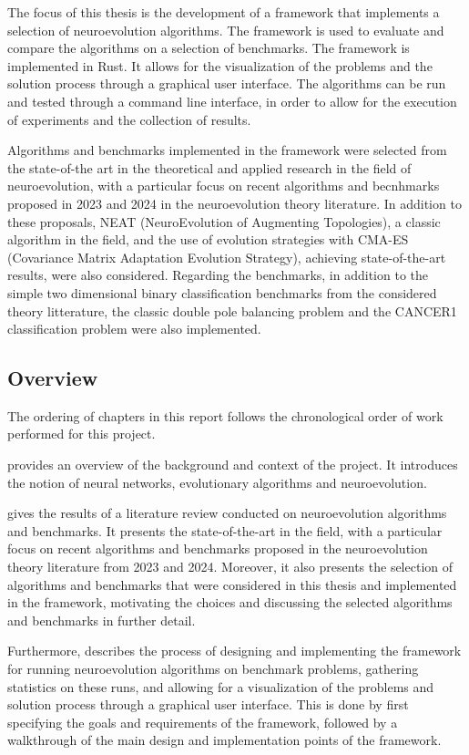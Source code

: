 The focus of this thesis is the development of a framework that implements a selection of neuroevolution algorithms.
The framework is used to evaluate and compare the algorithms on a selection of benchmarks.
The framework is implemented in Rust. It allows for the visualization of the problems and the solution process through a graphical user interface.
The algorithms can be run and tested through a command line interface, in order to allow for the execution of experiments and the collection of results.

Algorithms and benchmarks implemented in the framework were selected from the state-of-the art in the theoretical and applied research in the field of neuroevolution,
with a particular focus on recent algorithms and becnhmarks proposed in 2023 and 2024 in the neuroevolution theory literature.
In addition to these proposals, NEAT (NeuroEvolution of Augmenting Topologies), a classic algorithm in the field, and the use of evolution strategies with CMA-ES
(Covariance Matrix Adaptation Evolution Strategy), achieving state-of-the-art results, were also considered.
Regarding the benchmarks, in addition to the simple two dimensional binary classification benchmarks from the considered theory litterature, the
classic double pole balancing problem and the CANCER1 classification problem were also implemented.

\subsection{Overview}

The ordering of chapters in this report follows the chronological order of work performed for this project.

 provides an overview of the background and context of the project. It introduces the notion of neural networks, evolutionary algorithms
and neuroevolution.

 gives the results of a literature review conducted on neuroevolution algorithms and benchmarks. It presents the state-of-the-art in the field,
with a particular focus on recent algorithms and benchmarks proposed in the neuroevolution theory literature from 2023 and 2024.
Moreover, it also presents the selection of algorithms and benchmarks that were considered in this thesis and implemented in the framework, motivating the choices and
discussing the selected algorithms and benchmarks in further detail.

Furthermore,  describes the process of designing and implementing the framework for running neuroevolution algorithms on benchmark problems,
gathering statistics on these runs, and allowing for a visualization of the problems and solution process through a graphical user interface. This is done by first
specifying the goals and requirements of the framework, followed by a walkthrough of the main design and implementation points of the framework.

